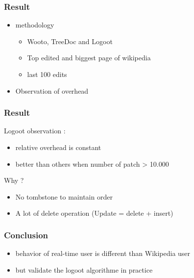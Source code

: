 \documentclass[14pt]{beamer}
\begin{document}
	\begin{frame}
		\frametitle{Result}
		\begin{itemize}
			\item methodology
				\begin{itemize}
					\item Wooto, TreeDoc and Logoot
					\item Top edited and biggest page of wikipedia
					\item last 100 edits
				\end{itemize}
			\item Observation of overhead
		\end{itemize}
		
	\end{frame}

	\begin{frame}
		\frametitle{Result}
			Logoot observation :
			\begin{itemize}
					\item relative overhead is constant
					\item better than others when number of patch > 10.000 
			\end{itemize}
			Why ?
			\begin{itemize}
				\item No tombstone to maintain order
				\item A lot of delete operation (Update = delete + insert)
			\end{itemize}
	\end{frame}

	\begin{frame}
		\frametitle{Conclusion}
			\begin{itemize}
				\item behavior of real-time user is different than Wikipedia user
				\item but validate the logoot algorithme in practice
			\end{itemize}
	\end{frame}
\end{document}
